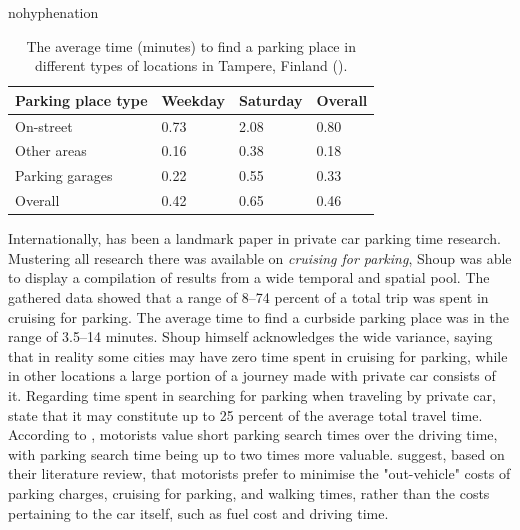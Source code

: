 \begin{hyphenrules}{nohyphenation}
    \begin{table}[H]
        \centering
        \caption[Parking time results in Kalenoja \& Häyrynen 2003]{The average time (minutes) to find a parking place in different types of locations in Tampere, Finland (\cite{Kalenoja2003}).} 
        \label{tab:kalenoja-parktimes}
        \begin{tabular}{ llll }
            \toprule
            Parking place type  & Weekday   & Saturday  & Overall \\
            \midrule
            On-street           & 0.73      & 2.08      & 0.80 \\
            Other areas         & 0.16      & 0.38      & 0.18 \\
            Parking garages     & 0.22      & 0.55      & 0.33 \\
            Overall             & 0.42      & 0.65      & 0.46 \\
            \bottomrule
        \end{tabular}
    \end{table}
\end{hyphenrules}

Internationally,  has been a landmark paper in private car parking time research. Mustering all research there was available on \textit{cruising for parking}, Shoup was able to display a compilation of results from a wide temporal and spatial pool. The gathered data showed that a range of 8--74 percent of a total trip was spent in cruising for parking. The average time to find a curbside parking place was in the range of 3.5--14 minutes. Shoup himself acknowledges the wide variance, saying that in reality some cities may have zero time spent in cruising for parking, while in other locations a large portion of a journey made with private car consists of it. Regarding time spent in searching for parking when traveling by private car,  state that it may constitute up to 25 percent of the average total travel time. According to , motorists value short parking search times over the driving time, with parking search time being up to two times more valuable.  suggest, based on their literature review, that motorists prefer to minimise the "out-vehicle" costs of parking charges, cruising for parking, and walking times, rather than the costs pertaining to the car itself, such as fuel cost and driving time.

